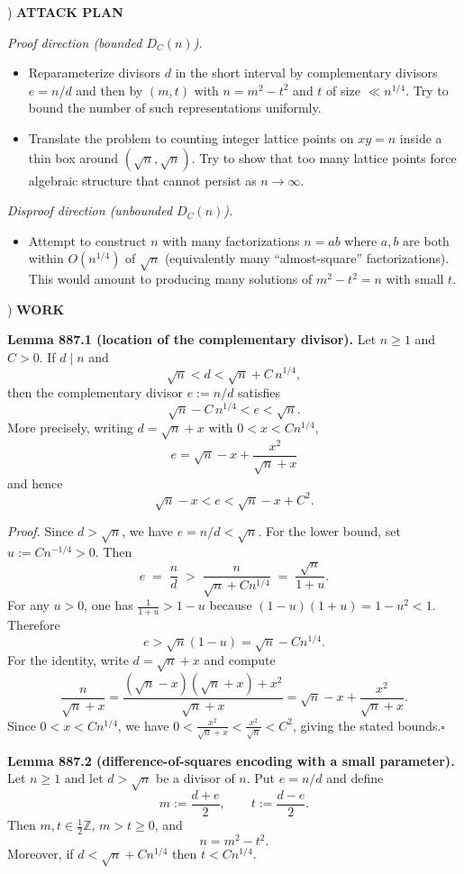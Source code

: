 ) \textbf{ATTACK PLAN}

\noindent \emph{Proof direction (bounded $D_C(n)$).}
\begin{itemize}
\item Reparameterize divisors $d$ in the short interval by complementary divisors $e=n/d$ and then by $(m,t)$ with $n=m^2-t^2$ and $t$ of size $\ll n^{1/4}$. Try to bound the number of such representations uniformly.
\item Translate the problem to counting integer lattice points on $xy=n$ inside a thin box around $(\sqrt n,\sqrt n)$. Try to show that too many lattice points force algebraic structure that cannot persist as $n\to\infty$.
\end{itemize}

\noindent \emph{Disproof direction (unbounded $D_C(n)$).}
\begin{itemize}
\item Attempt to construct $n$ with many factorizations $n=ab$ where $a,b$ are both within $O(n^{1/4})$ of $\sqrt n$ (equivalently many ``almost-square'' factorizations). This would amount to producing many solutions of $m^2-t^2=n$ with small $t$.
\end{itemize}

) \textbf{WORK}

\noindent \textbf{Lemma 887.1 (location of the complementary divisor).}
Let $n\ge 1$ and $C>0$. If $d\mid n$ and
\[\sqrt n< d < \sqrt n + C\,n^{1/4},\]
then the complementary divisor $e:=n/d$ satisfies
\[\sqrt n - C\,n^{1/4} < e < \sqrt n.\]
More precisely, writing $d=\sqrt n + x$ with $0<x<Cn^{1/4}$,
\[
 e = \sqrt n - x + \frac{x^2}{\sqrt n + x}
\]
and hence
\[\sqrt n - x < e < \sqrt n - x + C^2.\]

\noindent\emph{Proof.}
Since $d>\sqrt n$, we have $e=n/d<\sqrt n$.
For the lower bound, set $u:=C n^{-1/4}>0$. Then
\[
 e \;=\; \frac{n}{d}\;>\; \frac{n}{\sqrt n + Cn^{1/4}} 
 \;=\; \frac{\sqrt n}{1+u}.
\]
For any $u>0$, one has $\frac{1}{1+u} > 1-u$ because
$(1-u)(1+u)=1-u^2<1$. Therefore
\[
 e > \sqrt n(1-u)=\sqrt n - Cn^{1/4}.
\]
For the identity, write $d=\sqrt n + x$ and compute
\[
\frac{n}{\sqrt n + x}
= \frac{(\sqrt n - x)(\sqrt n + x) + x^2}{\sqrt n + x}
= \sqrt n - x + \frac{x^2}{\sqrt n + x}.
\]
Since $0<x<Cn^{1/4}$, we have $0<\frac{x^2}{\sqrt n + x} < \frac{x^2}{\sqrt n} < C^2$, giving the stated bounds.\hfill$\square$

\medskip
\noindent \textbf{Lemma 887.2 (difference-of-squares encoding with a small parameter).}
Let $n\ge 1$ and let $d>\sqrt n$ be a divisor of $n$. Put $e=n/d$ and define
\[
 m:=\frac{d+e}{2},\qquad t:=\frac{d-e}{2}.
\]
Then $m,t\in \tfrac12\mathbb{Z}$, $m>t\ge 0$, and
\[
 n = m^2 - t^2.
\]
Moreover, if $d < \sqrt n + Cn^{1/4}$ then $t < C n^{1/4}$.

